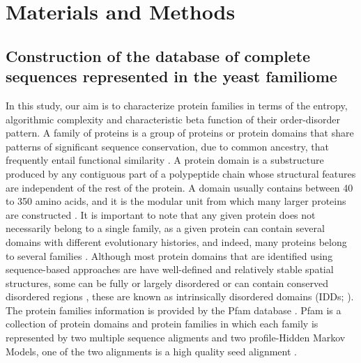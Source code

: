 \documentclass[preprint,12pt]{elsarticle}
\begin{document}
\bigbreak



\section{Materials and Methods}
\label{S:1}

\subsection{Construction of the database of complete sequences represented in the yeast familiome}

In this study, our aim is to characterize protein families in terms of the entropy, algorithmic complexity and characteristic beta function of their order-disorder pattern. A family of proteins is  a group of proteins or  protein domains that share patterns of significant sequence conservation, due to common ancestry, that frequently entail functional similarity \cite{nelson2017lehninger}. A protein domain is a substructure produced by any contiguous part of a polypeptide chain whose structural features are independent of the rest of the protein. A domain usually contains between 40 to 350 amino acids, and it is the modular unit from which many larger proteins are constructed \cite{alberts2015molecular}. It is important to note that any given protein does not necessarily belong to a single family, as a given protein can contain several domains with different evolutionary histories, and indeed, many proteins belong to several families \cite{bateman1999pfam}. Although most protein domains that are identified using sequence-based approaches are have well-defined and relatively stable spatial structures, some can be fully or largely disordered or can contain conserved disordered regions \cite{xue2010pondr}, these are known as intrinsically disordered domains (IDDs; \cite{tompa2009close}).
The protein families information is provided by the Pfam database \citet{sonnhammer1997pfam} \cite{bateman2004pfam} \cite{punta2011pfam} \cite{finn2015pfam}. Pfam is a collection of protein domains and protein families in which each family is represented by two multiple sequence aligments and two profile-Hidden Markov Models, one of the two alignments is a high quality seed alignment \cite{sonnhammer1997pfam} \cite{bateman2004pfam}.
\end{document}
